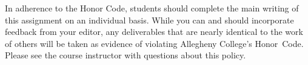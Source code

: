 
In adherence to the Honor Code, students should complete the main writing of this assignment on an individual basis.
While you can and should incorporate feedback from your editor, any deliverables that are nearly identical to the work
of others will be taken as evidence of violating Allegheny College's \mbox{Honor Code}. Please see the course instructor
with questions about this policy.


